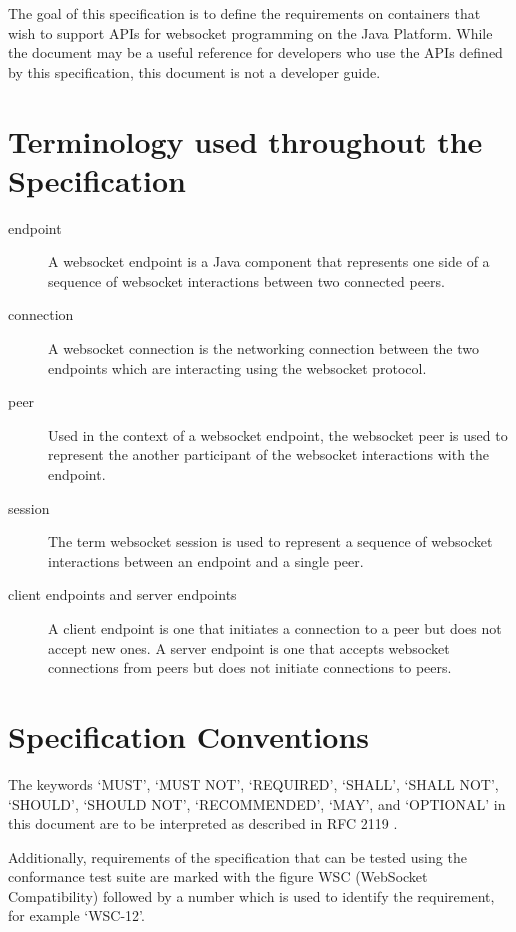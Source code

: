The goal of this specification is to define the requirements on containers that wish to support APIs for websocket programming on the Java Platform. While the document may be a useful reference for developers who use the APIs defined by this specification, this document is not a developer guide.

\section{Terminology used throughout the Specification}

\begin{description}

\item[endpoint] A websocket endpoint is a Java component that represents one side of a sequence of websocket interactions between two connected peers. 

\item[connection] A websocket connection is the networking connection between the two endpoints which are interacting using the websocket protocol.

\item[peer] Used in the context of a websocket endpoint, the websocket peer is used to represent the another participant of the websocket interactions with the endpoint.

\item[session] The term websocket session is used to represent a sequence of websocket interactions between an endpoint and a single peer.

\item[client endpoints and server endpoints] A client endpoint is one that initiates a connection to a peer but does not accept new ones. A server endpoint is one that accepts websocket connections from peers but does not initiate connections to peers.

\end{description}

\section{Specification Conventions}

The keywords `MUST', `MUST NOT', `REQUIRED', `SHALL', `SHALL NOT', `SHOULD', `SHOULD NOT', `RECOMMENDED', `MAY', and `OPTIONAL' in this document are to be interpreted as described in RFC 2119 \cite{rfc2119}. 

Additionally, requirements of the specification that can be tested using the conformance test suite are marked with the figure WSC (WebSocket Compatibility) followed by a number which is used to identify the requirement, for example ‘WSC-12’.

